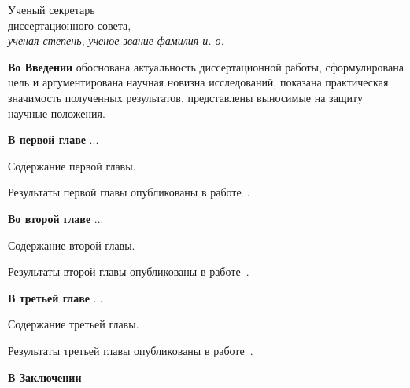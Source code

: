 \documentclass[autoref,subf,href
]{disser}
\begin{document}
\vfill\noindent
Ученый секретарь\\
диссертационного совета,\\
\emph{ученая степень}, \emph{ученое звание}%
\hfill
\makeatletter
\makeatother%
\emph{фамилия и. о.}

\clearpage


\actualitysection
\actualitytext

\objectivesection
\objectivetext

\noveltysection
\noveltytext

{}

\resultssection
\resultstext

\approbationsection
\approbationtext

\pubsection
\pubtext

\contribsection
\contribtext

\structsection
\structtext


\textbf{Во Введении} обоснована актуальность диссертационной работы,
сформулирована цель и аргументирована научная новизна исследований, показана
практическая значимость полученных результатов, представлены выносимые на
защиту научные положения.

\textbf{В первой главе} ...

Содержание первой главы.

Результаты первой главы опубликованы в
работе~.

\textbf{Во второй главе} ...

Содержание второй главы.

Результаты второй главы опубликованы в
работе~.

\textbf{В третьей главе} ...

Содержание третьей главы.

Результаты третьей главы опубликованы в
работе~.

\textbf{В Заключении}

\renewcommand\bibsection{\nsection{Список публикаций}}

\def\BibPrefix{A}

\renewcommand\bibsection{\nsection{Цитированная литература}}

\def\BibPrefix{}


\end{document}
